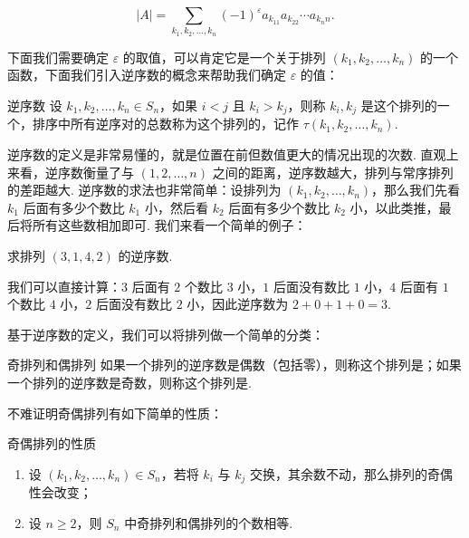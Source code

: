\[|A| = \sum\limits_{k_1,k_2,\ldots,k_n} (-1)^\varepsilon a_{k_11}a_{k_22}\cdots a_{k_nn}.\]

下面我们需要确定 $\varepsilon$ 的取值，可以肯定它是一个关于排列 $(k_1, k_2, \ldots, k_n)$ 的一个函数，下面我们引入逆序数的概念来帮助我们确定 $\varepsilon$ 的值：

\begin{definition}{逆序数}{}
    设 $k_1,k_2,\ldots,k_n \in S_n$，如果 $i < j$ 且 $k_i > k_j$，则称 $k_i,k_j$ 是这个排列的一个，排序中所有逆序对的总数称为这个排列的，记作 $\tau(k_1,k_2,\ldots,k_n)$.
\end{definition}
逆序数的定义是非常易懂的，就是位置在前但数值更大的情况出现的次数. 直观上来看，逆序数衡量了与 $(1,2,\ldots,n)$ 之间的距离，逆序数越大，排列与常序排列的差距越大. 逆序数的求法也非常简单：设排列为 $(k_1,k_2,\ldots,k_n)$，那么我们先看 $k_1$ 后面有多少个数比 $k_1$ 小，然后看 $k_2$ 后面有多少个数比 $k_2$ 小，以此类推，最后将所有这些数相加即可. 我们来看一个简单的例子：

\begin{example}{}{}
    求排列 $(3,1,4,2)$ 的逆序数.
\end{example}

\begin{solution}
    我们可以直接计算：$3$ 后面有 $2$ 个数比 $3$ 小，$1$ 后面没有数比 $1$ 小，$4$ 后面有 $1$ 个数比 $4$ 小，$2$ 后面没有数比 $2$ 小，因此逆序数为 $2+0+1+0=3$.
\end{solution}

基于逆序数的定义，我们可以将排列做一个简单的分类：

\begin{definition}{奇排列和偶排列}{}
    如果一个排列的逆序数是偶数（包括零），则称这个排列是；如果一个排列的逆序数是奇数，则称这个排列是.
\end{definition}

不难证明奇偶排列有如下简单的性质：
\begin{example}{奇偶排列的性质}{}
    \begin{enumerate}
        \item 设 $(k_1,k_2,\ldots,k_n) \in S_n$，若将 $k_i$ 与 $k_j$ 交换，其余数不动，那么排列的奇偶性会改变；
        \item 设 $n \geqslant 2$，则 $S_n$ 中奇排列和偶排列的个数相等.
    \end{enumerate}
\end{example}

